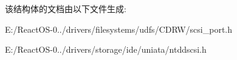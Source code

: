 该结构体的文档由以下文件生成\+:\begin{DoxyCompactItemize}
\item 
E\+:/\+React\+O\+S-\/0../drivers/filesystems/udfs/\+C\+D\+R\+W/scsi\+\_\+port.\+h\item 
E\+:/\+React\+O\+S-\/0../drivers/storage/ide/uniata/ntddscsi.\+h\end{DoxyCompactItemize}
